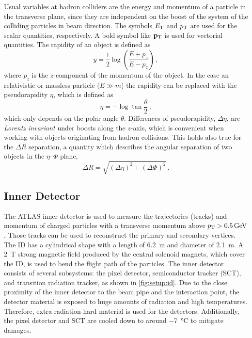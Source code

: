 Usual variables at hadron colliders are the energy and momentum of a particle in the transverse plane, since
they are independent on the boost of the system of the colliding particles in beam direction.
The symbols $E_\text{T}$ and $p_\text{T}$ are used for the scalar quantities, respectively.
A bold symbol like $\mathbf{p}_\text{T}$ is used for vectorial quantities.
The rapidity of an object is defined as
\begin{equation}
    \label{eq:rapidity}
    y = \frac{1}{2} \log \left( \frac{E + p_z}{E - p_z}\right) \,,
\end{equation}
where $p_z$ is the $z$-component of the momentum of the object.
In the case an relativistic or massless particle ($E \gg m$) the rapidity can be replaced with the pseudorapidity $\eta$,
which is defined as
\begin{equation}
    \label{eq:pseudorapidity}
    \eta = - \log \tan \frac{\theta}{2} \,,
\end{equation}
which only depends on the polar angle $\theta$.
Differences of pseudorapidity, $\Delta \eta$, are \emph{Lorentz invariant} under boosts along the $z$-axis,
which is convenient when working with objects originating from hadron collisions.
This holds also true for the $\Delta R$ separation, a quantity which describes the angular separation of two objects
in the $\eta$\nobreakdash--$\Phi$ plane,
\begin{equation}
    \label{eq:deltar}
    \Delta R = \sqrt{{\left(\Delta\eta\right)}^2 + {\left(\Delta \Phi\right)}^2} \,.
\end{equation}

\subsection{Inner Detector}\label{sub:setup:id}

The ATLAS inner detector is used to measure the trajectories (tracks) and momentum of charged particles with
a transverse momentum above $\pt > \SI{0.5}{\GeV}$.
Those tracks can be used to reconstruct the primary and secondary vertices.
The ID has a cylindrical shape with a length of \SI{6.2}{\m} and diameter of \SI{2.1}{\m}.
A \SI{2}{\tesla} strong magnetic field produced by the central solenoid magnets, which cover the ID, is used to bend the flight path of the particles.
The inner detector consists of several subsystems: the pixel detector, semiconductor tracker (SCT), and transition
radiation tracker, as shown in \cref{fig:setup:id}.
Due to the close proximity of the inner detector to the beam pipe and the interaction point, the detector material
is exposed to huge amounts of radiation and high temperatures.
Therefore, extra radiation-hard material is used for the detectors.
Additionally, the pixel detector and SCT are cooled down to around \SI{-7}{\degreeCelsius} to mitigate damages.

